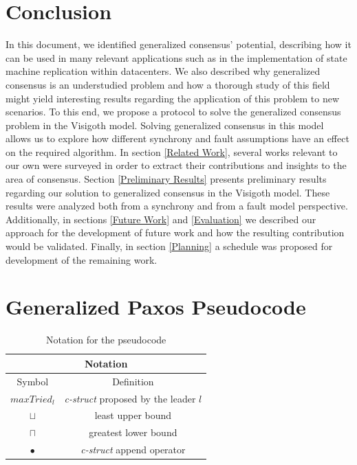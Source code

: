 \documentclass[runningheads,a4paper]{llncs}
\begin{document}
\section{Conclusion}
In this document, we identified generalized consensus' potential, describing how it can be used in many relevant applications such as in the implementation of state machine replication within datacenters. We also described why generalized consensus is an understudied problem and how a thorough study of this field might yield interesting results regarding the application of this problem to new scenarios. To this end, we propose a protocol to solve the generalized consensus problem in the Visigoth model. Solving generalized consensus in this model allows us to explore how different synchrony and fault assumptions have an effect on the required algorithm. In section \ref{Related Work}, several works relevant to our own were surveyed in order to extract their contributions and insights to the area of consensus. Section \ref{Preliminary Results} presents preliminary results regarding our solution to generalized consensus in the Visigoth model. These results were analyzed both from a synchrony and from a fault model perspective. Additionally, in sections \ref{Future Work} and \ref{Evaluation} we described our approach for the development of future work and how the resulting contribution would be validated. Finally, in section \ref{Planning} a schedule was proposed for development of the remaining work.




\newpage
\appendix


\section{Generalized Paxos Pseudocode} \label{Pseudocode}

\begin{table}[h!]
	\renewcommand{\arraystretch}{1.5}
	\centering
	\begin{tabular}{ |c|c|}
		\hline
		\multicolumn{2}{|c|}{Notation}\\
		\hline
		Symbol & Definition \\
		\hline
		$maxTried_l$  & \textit{c-struct} proposed by the leader $l$ \\
		\hline
		$\sqcup$ & least upper bound \\
		\hline
		$\sqcap$ & greatest lower bound \\
		\hline
		$\bullet$ & \textit{c-struct} append operator \\
		\hline
	\end{tabular} 
	\caption{Notation for the pseudocode} 
	\label{table:1}
\end{table}
\end{document}
